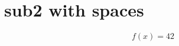 \section{sub2 with spaces}\label{sec:sub2 with spaces}

\begin{equation}
  f(x) = 42
  \label{eq:included sub with spaces is working}
\end{equation}
